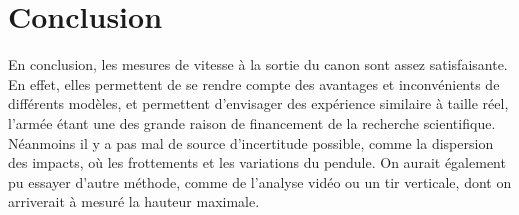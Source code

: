 \documentclass[11pt]{article}
\begin{document}
\section{Conclusion}
En conclusion, les mesures de vitesse à la sortie du canon sont assez satisfaisante. En effet, elles permettent de se rendre compte des avantages et inconvénients de différents modèles, et permettent d'envisager des expérience similaire à taille réel, l'armée étant une des grande raison de financement de la recherche scientifique. Néanmoins il y a pas mal de source d'incertitude possible, comme la dispersion des impacts, où les frottements et les variations du pendule. On aurait également pu essayer d'autre méthode, comme de l'analyse vidéo ou un tir verticale, dont on arriverait à mesuré la hauteur maximale.
\end{document}
